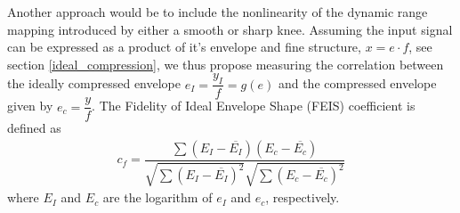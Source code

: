 \documentclass[../main2.tex]{subfiles}
\begin{document}
Another approach would be to include the nonlinearity of the dynamic range mapping introduced by either a smooth or sharp knee. Assuming the input signal can be expressed as a product of it's envelope and fine structure, $x  = e\cdot f$, see section \ref{ideal_compression}, we thus propose measuring the correlation between the ideally compressed envelope $e_{I}=\dfrac{y_{I}}{f} = g(e)$ and the compressed envelope  given by $e_c = \dfrac{y}{f}$. The Fidelity of Ideal Envelope Shape (FEIS) coefficient is defined as
\begin{align}
c_{f} = \dfrac{\sum\left(E_I-\overline{E_I}\right)\left(E_c-\overline{E_c}\right)}{\sqrt{\sum\left(E_I-\overline{E_I}\right)^2}\sqrt{\sum\left(E_c-\overline{E_c}\right)^2}}
\end{align}
where $E_I$ and $E_c$ are the logarithm of $e_I$ and $e_c$, respectively.
\end{document}

